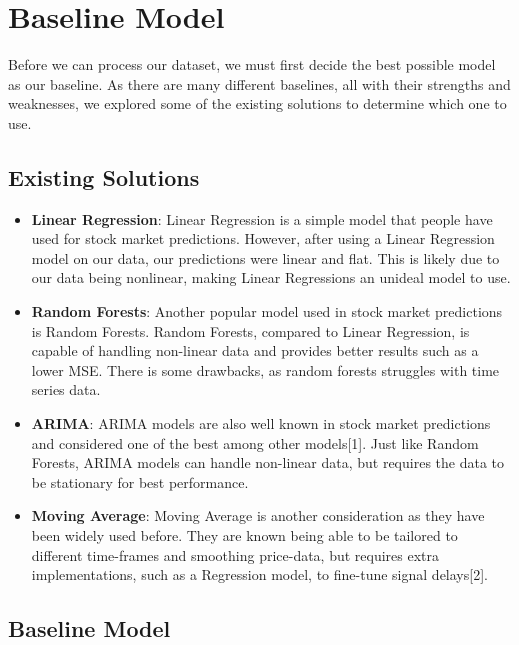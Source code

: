\documentclass[conference]{IEEEtran}
\begin{document}
\section{Baseline Model}

Before we can process our dataset, we must first decide the best possible model as our baseline. As there are many different baselines, all with their strengths and weaknesses, we explored some of the existing solutions to determine which one to use.

\subsection{Existing Solutions}

\begin{itemize}

    \item \textbf{Linear Regression}: Linear Regression is a simple model that people have used for stock market predictions. However, after using a Linear Regression model on our data, our predictions were linear and flat. This is likely due to our data being nonlinear, making Linear Regressions an unideal model to use.   

    \item \textbf{Random Forests}: Another popular model used in stock market predictions is Random Forests. Random Forests, compared to Linear Regression, is capable of handling non-linear data and provides better results such as a lower MSE. There is some drawbacks, as random forests struggles with time series data.

    \item \textbf{ARIMA}: ARIMA models are also well known in stock market predictions and considered one of the best among other models[1]. Just like Random Forests, ARIMA models can handle non-linear data, but requires the data to be stationary for best performance. 

    \item \textbf{Moving Average}: Moving Average is another consideration as they have been widely used before. They are known being able to be tailored to different time-frames and smoothing price-data, but requires extra implementations, such as a Regression model, to fine-tune signal delays[2].

\end{itemize}

\subsection{Baseline Model}
\end{document}
